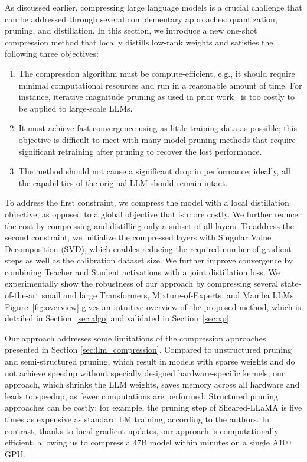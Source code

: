As discussed earlier, compressing large language models is a crucial challenge that can be addressed through several complementary approaches: quantization, pruning, and distillation. In this section, we introduce a new one-shot compression method that locally distills low-rank weights and satisfies the following three objectives:
\begin{enumerate}
\item The compression algorithm must be compute-efficient, e.g., it should require minimal computational resources and run in a reasonable amount of time. For instance, iterative magnitude pruning as used in prior work~\citep{frankle2019lottery} is too costly to be applied to large-scale LLMs.
\item It must achieve fast convergence using as little training data as possible; this objective is difficult to meet with many model pruning methods that require significant retraining after pruning to recover the lost performance.
\item The method should not cause a significant drop in performance; ideally, all the capabilities of the original LLM should remain intact.
\end{enumerate}
To address the first constraint, we compress the model with a local distillation objective, as opposed to a global objective that is more costly. We further reduce the cost by compressing and distilling only a subset of all layers.
To address the second constraint, we initialize the compressed layers with Singular Value Decomposition (SVD), which enables
reducing the required number of gradient steps as well as the calibration dataset size. We further improve convergence by combining Teacher and Student activations with a joint distillation loss.
We experimentally show the robustness of our approach by compressing several state-of-the-art small and large Transformers, Mixture-of-Experts, and Mamba LLMs.
Figure~\ref{fig:overview} gives an intuitive overview of the proposed method, which is detailed in Section~\ref{sec:algo} and validated in Section~\ref{sec:xp}.

Our approach addresses some limitations of the compression approaches
presented in Section \ref{sec:llm_compression}. Compared to unstructured pruning
and semi-structured pruning, which result in models with sparse weights and do not achieve speedup without specially designed hardware-specific kernels, our approach, which shrinks
the LLM weights, saves memory across all hardware and leads to speedup, as fewer computations are performed. Structured pruning approaches can be costly: for example, the pruning step of Sheared-LLaMA \citep{xia_sheared_2023} is five times as expensive as standard LM training, according to the authors. In contrast, thanks to local gradient updates, our approach is computationally efficient, allowing us to compress a 47B model within minutes on a single A100 GPU.

